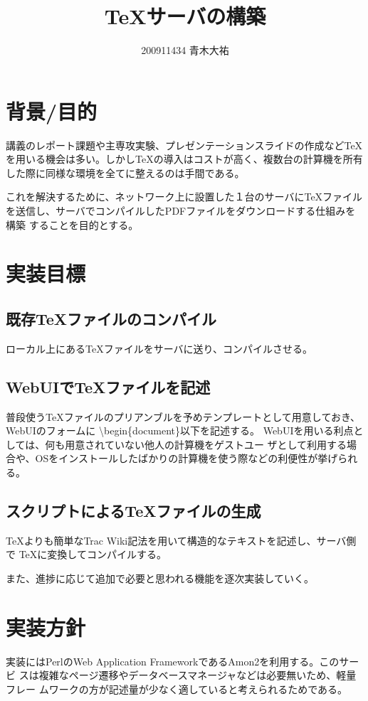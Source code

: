 \documentclass[a4paper,8pt,min]{jsarticle}
\title{TeXサーバの構築}
\author{200911434 青木大祐}
\begin{document}
\maketitle
\section{背景/目的}
講義のレポート課題や主専攻実験、プレゼンテーションスライドの作成などTeX
を用いる機会は多い。しかしTeXの導入はコストが高く、複数台の計算機を所有
した際に同様な環境を全てに整えるのは手間である。

これを解決するために、ネットワーク上に設置した１台のサーバにTeXファイル
を送信し、サーバでコンパイルしたPDFファイルをダウンロードする仕組みを構築
することを目的とする。

\section{実装目標}
\subsection{既存TeXファイルのコンパイル}
ローカル上にあるTeXファイルをサーバに送り、コンパイルさせる。

\subsection{WebUIでTeXファイルを記述}
普段使うTeXファイルのプリアンブルを予めテンプレートとして用意しておき、WebUIのフォームに
\textbackslash begin\{document\}以下を記述する。
WebUIを用いる利点としては、何も用意されていない他人の計算機をゲストユー
ザとして利用する場合や、OSをインストールしたばかりの計算機を使う際などの利便性が挙げられる。

\subsection{スクリプトによるTeXファイルの生成}
TeXよりも簡単なTrac Wiki記法を用いて構造的なテキストを記述し、サーバ側で
TeXに変換してコンパイルする。


また、進捗に応じて追加で必要と思われる機能を逐次実装していく。

\section{実装方針}
実装にはPerlのWeb Application FrameworkであるAmon2を利用する。このサービ
スは複雑なページ遷移やデータベースマネージャなどは必要無いため、軽量フレー
ムワークの方が記述量が少なく適していると考えられるためである。
\end{document}
